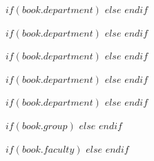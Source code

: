 

\examiner{} %


\author{$author$} %

\addresses{} %

\subject{} %

$if(book.department)$
$else$\keywords{}
$endif$

$if(book.department)$
$else$\city{}
$endif$

$if(book.department)$
$else$\dateyear{}
$endif$

$if(book.department)$
$else$\university{}
$endif$

$if(book.department)$
$else$\department{}
$endif$

$if(book.group)$
$else$\group{}
$endif$

$if(book.faculty)$
$else$
\faculty{}
$endif$

\setcounter{tocdepth}{$if(toc-depth)$$toc-depth$$else$3$endif$} %
